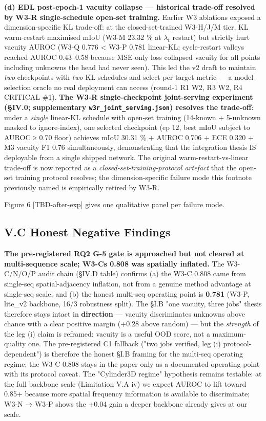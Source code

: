 \documentclass[
]{article}
\begin{document}
\textbf{(d) EDL post-epoch-1 vacuity collapse --- historical trade-off
resolved by W3-R single-schedule open-set training.} Earlier W3
ablations exposed a dimension-specific KL trade-off: at the
closed-set-trained W3-H/J/M tier, KL warm-restart maximised mIoU (W3-M
23.32 \% at \(\lambda_t\) restart) but strictly hurt vacuity AUROC (W3-Q
0.776 \textless{} W3-P 0.781 linear-KL; cycle-restart valleys reached
AUROC 0.43--0.58 because MSE-only loss collapsed vacuity for all points
including unknowns the head had never seen). This led the v2 draft to
maintain \emph{two} checkpoints with \emph{two} KL schedules and select
per target metric --- a model-selection oracle no real deployment can
access (round-1 R1 W2, R3 W2, R4 CRITICAL \#1). \textbf{The W3-R
single-checkpoint joint-serving experiment (§IV.0; supplementary
\texttt{w3r\_joint\_serving.json}) resolves the trade-off}: under a
\emph{single} linear-KL schedule with open-set training (14-known +
5-unknown masked to ignore-index), one selected checkpoint (ep 12, best
mIoU subject to AUROC ≥ 0.70 floor) achieves mIoU 30.31 \% + AUROC 0.706
+ ECE 0.320 + M3 vacuity F1 0.76 simultaneously, demonstrating that the
integration thesis IS deployable from a single shipped network. The
original warm-restart-vs-linear trade-off is now reported as a
\emph{closed-set-training-protocol artefact} that the open-set training
protocol resolves; the dimension-specific failure mode this footnote
previously named is empirically retired by W3-R.

Figure 6 {[}TBD-after-exp{]} gives one qualitative panel per failure
mode.

\subsection{V.C Honest Negative
Findings}\label{vc-honest-negative-findings}

\textbf{The pre-registered RQ2 G-5 gate is approached but not cleared at
multi-sequence scale; W3-C\textquotesingle s 0.808 was spatially
inflated.} The W3-C/N/O/P audit chain (§IV.D table) confirms (a) the
W3-C 0.808 came from single-seq spatial-adjacency inflation, not from a
genuine method advantage at single-seq scale, and (b) the honest
multi-seq operating point is \textbf{0.781} (W3-P, lite\_v2 backbone,
16/3 robustness split). The §I.B "one vacuity, three jobs" thesis
therefore stays intact in \textbf{direction} --- vacuity discriminates
unknowns above chance with a clear positive margin (+0.28 above random)
--- but the \emph{strength} of the leg (i) claim is reframed: vacuity is
a useful OOD score, not a maximum-quality one. The pre-registered C1
fallback ("two jobs verified, leg (i) protocol-dependent") is therefore
the honest §I.B framing for the multi-seq operating regime; the W3-C
0.808 stays in the paper only as a documented operating point with its
protocol caveat. The "Cylinder3D regime" hypothesis remains testable: at
the full backbone scale (Limitation V.A iv) we expect AUROC to lift
toward 0.85+ because more spatial frequency information is available to
discriminate; W3-N → W3-P shows the +0.04 gain a deeper backbone already
gives at our scale.
\end{document}
